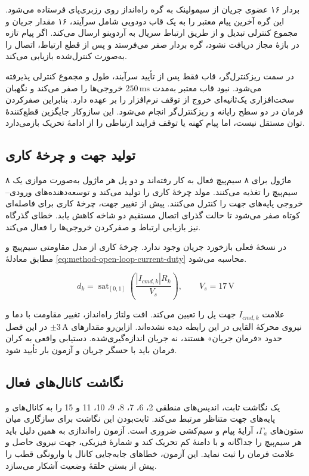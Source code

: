 بردار ۱۶ عضوی جریان از سیمولینک به گره راه‌انداز روی رزبری‌پای فرستاده می‌شود. این گره آخرین پیام معتبر را به یک قاب دودویی شامل سرآیند، ۱۶ مقدار جریان و مجموع کنترلی تبدیل و از طریق ارتباط سریال به آردوینو ارسال می‌کند. اگر پیام تازه در بازهٔ مجاز دریافت نشود، گره بردار صفر می‌فرستد و پس از قطع ارتباط، اتصال را به‌صورت کنترل‌شده بازیابی می‌کند.

در سمت ریزکنترل‌گر، قاب فقط پس از تأیید سرآیند، طول و مجموع کنترلی پذیرفته می‌شود. نبود قاب معتبر به‌مدت $250\,\mathrm{ms}$ خروجی‌ها را صفر می‌کند و نگهبان سخت‌افزاری یک‌ثانیه‌ای خروج از توقف نرم‌افزار را بر عهده دارد. بنابراین صفرکردن فرمان در دو سطح رایانه و ریزکنترل‌گر انجام می‌شود. این سازوکار جایگزین قطع‌کنندهٔ توان مستقل نیست، اما پیام کهنه یا توقف فرایند ارتباطی را از ادامهٔ تحریک بازمی‌دارد.

\subsection{تولید جهت و چرخهٔ کاری}

۸ ماژول  برای ۸ سیم‌پیچ فعال به کار رفته‌اند و دو پل هر ماژول به‌صورت موازی یک سیم‌پیچ را تغذیه می‌کنند. مولد  چرخهٔ کاری را تولید می‌کند و توسعه‌دهنده‌های ورودی--خروجی پایه‌های جهت را کنترل می‌کنند. پیش از تغییر جهت، چرخهٔ کاری برای فاصله‌ای کوتاه صفر می‌شود تا حالت گذرای اتصال مستقیم دو شاخه کاهش یابد. خطای گذرگاه نیز بازیابی ارتباط و صفرکردن خروجی‌ها را فعال می‌کند.

در نسخهٔ فعلی بازخورد جریان وجود ندارد. چرخهٔ کاری از مدل مقاومتی سیم‌پیچ و مطابق معادلهٔ \ref{eq:method-open-loop-current-duty} محاسبه می‌شود.

\begin{equation}
	d_k=\operatorname{sat}_{[0,1]}
	\left(\frac{|I_{cmd,k}|R_k}{V_s}\right),
	\qquad V_s=17\,\mathrm V
	\label{eq:method-open-loop-current-duty}
\end{equation}

علامت $I_{cmd,k}$ جهت پل را تعیین می‌کند. افت ولتاژ راه‌انداز، تغییر مقاومت با دما و نیروی محرکهٔ القایی در این رابطه دیده نشده‌اند. ازاین‌رو مقدارهای $\pm3\,\mathrm A$ در این فصل حدود «فرمان جریان» هستند، نه جریان اندازه‌گیری‌شده. دستیابی واقعی به کران فرمان باید با حسگر جریان و آزمون بار تأیید شود.

\subsection{نگاشت کانال‌های فعال}

یک نگاشت ثابت، اندیس‌های منطقی 2، 6، 7، 8، 9، 10، 11 و 15 را به کانال‌های  و پایه‌های جهت متناظر مرتبط می‌کند. ثابت‌بودن این نگاشت برای سازگاری میان ستون‌های $\Gamma_a$، آرایهٔ پیام و سیم‌کشی ضروری است. آزمون راه‌اندازی به همین دلیل باید هر سیم‌پیچ را جداگانه و با دامنهٔ کم تحریک کند و شمارهٔ فیزیکی، جهت نیروی حاصل و علامت فرمان را ثبت نماید. این آزمون، خطاهای جابه‌جایی کانال یا وارونگی قطب را پیش از بستن حلقهٔ وضعیت آشکار می‌سازد.

